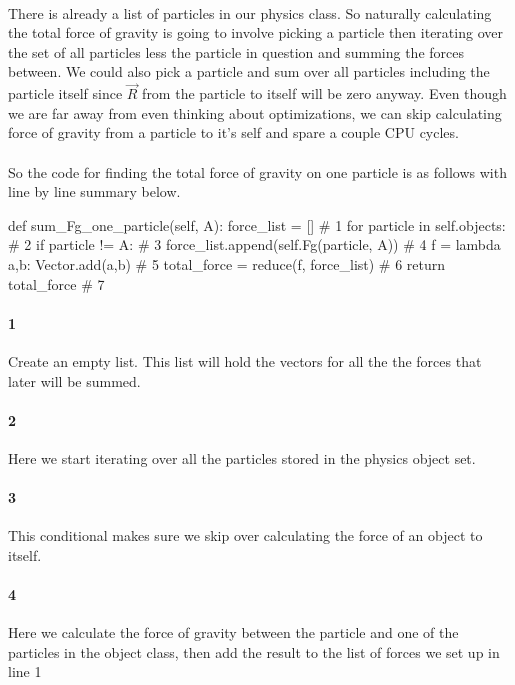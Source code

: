 \documentclass[15pt]{report}
\begin{document}
\paragraph{} There is already a list of particles in our physics class. So naturally calculating the total force of gravity is going to involve picking a particle then iterating over the set of all particles less the particle in question and summing the forces between. We could also pick a particle and sum over all particles including the particle itself since $\vec{R}$ from the particle to itself will be zero anyway. Even though we are far away from even thinking about optimizations, we can skip calculating force of gravity from a particle to it's self and spare a couple CPU cycles. 
\paragraph{} So the code for finding the total force of gravity on one particle is as follows with line by line summary below.

\begin{code}
    def sum_Fg_one_particle(self, A):
        force_list = []                                   # 1
        for particle in self.objects:                     # 2
            if particle != A:                             # 3
                force_list.append(self.Fg(particle, A))   # 4
        f = lambda a,b: Vector.add(a,b)                   # 5
        total_force = reduce(f, force_list)               # 6
        return total_force                                # 7
\end{code} 

\paragraph{1} Create an empty list. This list will hold the vectors for all the the forces that later will be summed. 
\paragraph{2} Here we start iterating over all the particles stored in the physics object set. 
\paragraph{3} This conditional makes sure we skip over calculating the force of an object to itself.
\paragraph{4} Here we calculate the force of gravity between the particle and one of the particles in the object class, then add the result to the list of forces we set up in line 1
\end{document}
